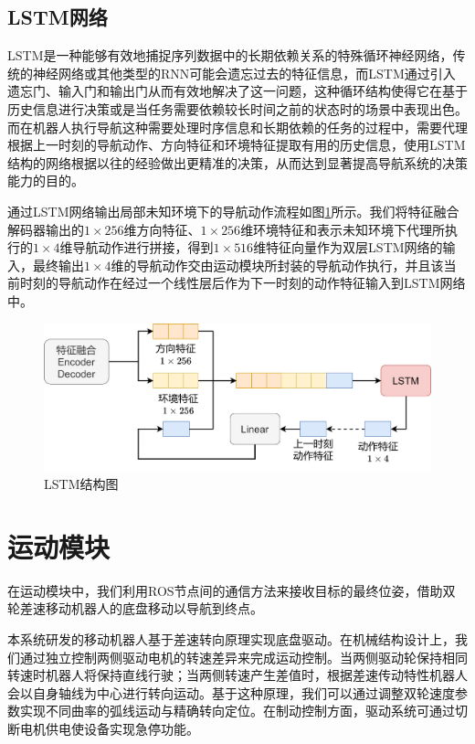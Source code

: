 \subsection{LSTM网络}
LSTM是一种能够有效地捕捉序列数据中的长期依赖关系的特殊循环神经网络，传统的神经网络或其他类型的RNN可能会遗忘过去的特征信息，而LSTM通过引入遗忘门、输入门和输出门从而有效地解决了这一问题，这种循环结构使得它在基于历史信息进行决策或是当任务需要依赖较长时间之前的状态时的场景中表现出色。而在机器人执行导航这种需要处理时序信息和长期依赖的任务的过程中，需要代理根据上一时刻的导航动作、方向特征和环境特征提取有用的历史信息，使用LSTM结构的网络根据以往的经验做出更精准的决策，从而达到显著提高导航系统的决策能力的目的。

通过LSTM网络输出局部未知环境下的导航动作流程如图\ref{LSTM}所示。我们将特征融合解码器输出的$1 \times 256$维方向特征、$1 \times 256$维环境特征和表示未知环境下代理所执行的$1 \times 4$维导航动作进行拼接，得到$1 \times 516$维特征向量作为双层LSTM网络的输入，最终输出$1 \times 4$维的导航动作交由运动模块所封装的导航动作执行，并且该当前时刻的导航动作在经过一个线性层后作为下一时刻的动作特征输入到LSTM网络中。
\begin{figure}[htbp]
    \centering
    \includegraphics[scale=0.10]{Fig/LSTM.png}
    \caption{\label{LSTM}LSTM结构图}
\end{figure}


\section{运动模块}
在运动模块中，我们利用ROS节点间的通信方法来接收目标的最终位姿，借助双轮差速移动机器人的底盘移动以导航到终点。


本系统研发的移动机器人基于差速转向原理实现底盘驱动。在机械结构设计上，我们通过独立控制两侧驱动电机的转速差异来完成运动控制。当两侧驱动轮保持相同转速时机器人将保持直线行驶；当两侧转速产生差值时，根据差速传动特性机器人会以自身轴线为中心进行转向运动。基于这种原理，我们可以通过调整双轮速度参数实现不同曲率的弧线运动与精确转向定位。在制动控制方面，驱动系统可通过切断电机供电使设备实现急停功能。


